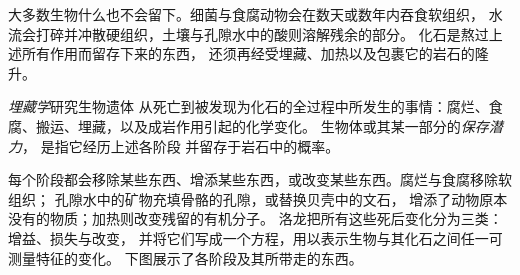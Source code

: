 大多数生物什么也不会留下。细菌与食腐动物会在数天或数年内吞食软组织，
水流会打碎并冲散硬组织，土壤与孔隙水中的酸则溶解残余的部分。
化石是熬过上述所有作用而留存下来的东西，
还须再经受埋藏、加热以及包裹它的岩石的隆升。

\begin{definition}\label{def:b2:palaeoenvironments:taphonomy}
\emph{埋藏学}研究生物遗体
从死亡到被发现为化石的全过程中所发生的事情：腐烂、食腐、搬运、埋藏，以及成岩作用引起的化学变化。
生物体或其某一部分的\emph{保存潜力}，
是指它经历上述各阶段
并留存于岩石中的概率。
\end{definition}

每个阶段都会移除某些东西、增添某些东西，或改变某些东西。腐烂与食腐移除软组织；
孔隙水中的矿物充填骨骼的孔隙，或替换贝壳中的文石，
增添了动物原本没有的物质；加热则改变残留的有机分子。
洛龙把所有这些死后变化分为三类：增益、损失与改变，
并将它们写成一个方程，用以表示生物与其化石之间任一可测量特征的变化。
下图展示了各阶段及其所带走的东西。

